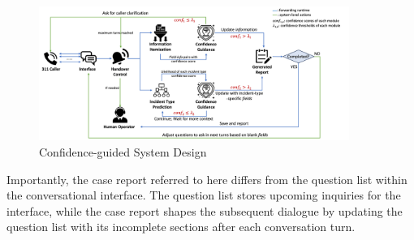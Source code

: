 
\begin{figure}[t]
    \centering
    \includegraphics[width=0.9\textwidth]{figures/system_logic.png}
    \caption{Confidence-guided System Design}
    \label{fig:sys_logic}
    \vspace{-0.5cm}
\end{figure}

Importantly, the case report referred to here differs from the question list within the conversational interface. The question list stores upcoming inquiries for the interface, while the case report shapes the subsequent dialogue by updating the question list with its incomplete sections after each conversation turn.


